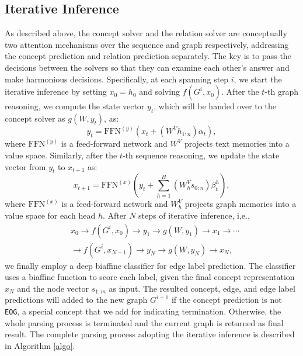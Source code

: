 \documentclass[11pt,a4paper]{article}
\begin{document}
	\subsection{Iterative Inference}
	As described above, the concept solver and the relation solver are conceptually two attention mechanisms over the sequence and graph respectively, addressing the concept prediction and relation prediction separately. The key is to pass the decisions between the solvers so that they can examine each other's answer and make harmonious decisions. Specifically, at each spanning step $i$, we start the iterative inference by setting $x_0 = h_0$ and solving $f(G^i, x_0)$. After the $t$-th graph reasoning, we compute the state vector $y_t$, which will be handed over to the concept solver as $g(W, y_t)$, as:
	\begin{equation}
	y_t = \text{FFN}^{(y)}(x_t + (W^{V}h_{1:n}) \alpha_t),
	\nonumber
	\end{equation}
	where $\text{FFN}^{(y)}$ is a feed-forward network and $W^{V}$ projects text memories into a value space. 
	Similarly, after the $t$-th sequence reasoning, we update the state vector from $y_t$ to $x_{t+1}$ as:
	\begin{equation}
	x_{t+1} = \text{FFN}^{(x)}(y_t + \sum_{h=1}^{H}(W^{V}_hs_{0:n})\beta^h_t),
	\nonumber
	\end{equation}
	where $\text{FFN}^{(x)}$ is a feed-forward network and $W^{V}_h$ projects graph memories into a value space for each head $h$. 
	After $N$ steps of iterative inference, i,e., 
	\begin{align*}
	&x_0 \rightarrow f(G^i, x_0) \rightarrow y_1 \rightarrow g(W, y_1) \rightarrow x_1 \rightarrow \cdots\\
	&\rightarrow  f(G^i, x_{N-1}) \rightarrow y_N \rightarrow g(W, y_N) \rightarrow x_{N},
	\end{align*}
	we finally employ a deep biaffine classifier \cite{dozat2016deep} for edge label prediction. The classifier uses a biaffine function to score each label, given the final concept representation $x_N$ and the node vector $s_{1:m}$ as input. The resulted concept, edge, and edge label predictions will added to the new graph $G^{i+1}$ if the concept prediction is not \texttt{EOG}, a special concept that we add for indicating termination. Otherwise, the whole parsing process is terminated and the current graph is returned as final result. The complete parsing process adopting the iterative inference is described in Algorithm \ref{algo}.
	
\end{document}
